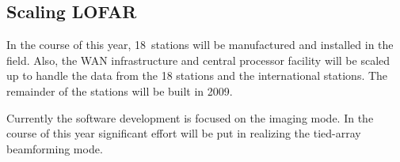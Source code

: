 \documentclass[journal]{IEEEtran}
\begin{document}
\subsection{Scaling LOFAR}
In the course of this year, 18~stations will be manufactured and installed in the field. Also, the WAN infrastructure and central processor facility will be scaled up to handle the data from the 18 stations and the international stations.
The remainder of the stations will be built in 2009.

Currently the software development is focused on the imaging mode.
In the course of this year significant effort will be put in realizing the
tied-array beamforming mode.



%



\section{}
\end{document}
